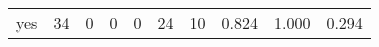 \begin{longtable}{lp{1.3cm}p{1.3cm}p{1.3cm}p{1.3cm}p{1.3cm}p{1.3cm}p{1.3cm}p{1.3cm}p{1.3cm}}
yes       &                     34 &                                             0 &                                            0 &                                           0 &                                           24 &                                         10 &                                0.824 &                                  1.000 &                                0.294 \\
\end{longtable}
